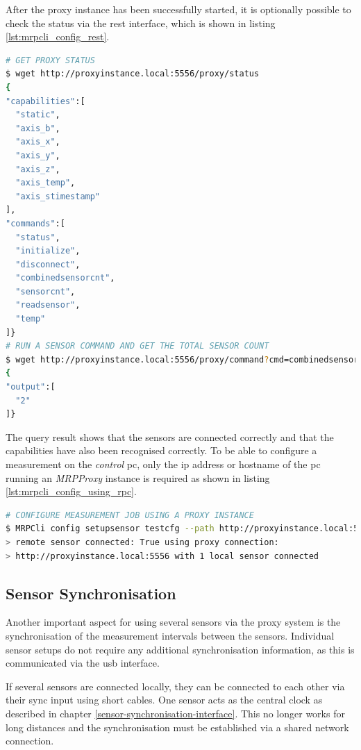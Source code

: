 After the proxy instance has been successfully started, it is optionally
possible to check the status via the \gls{rest} interface, which is
shown in listing \ref{lst:mrpcli_config_rest}.

\begin{lstlisting}[language=bash, caption={MRPProxy provided REST endpoint query example using wget command line tool to send requests}, label=lst:mrpcli_config_rest]
# GET PROXY STATUS
$ wget http://proxyinstance.local:5556/proxy/status
{
"capabilities":[
  "static",
  "axis_b",
  "axis_x",
  "axis_y",
  "axis_z",
  "axis_temp",
  "axis_stimestamp"
],
"commands":[
  "status",
  "initialize",
  "disconnect",
  "combinedsensorcnt",
  "sensorcnt",
  "readsensor",
  "temp"
]}
# RUN A SENSOR COMMAND AND GET THE TOTAL SENSOR COUNT
$ wget http://proxyinstance.local:5556/proxy/command?cmd=combinedsensorcnt
{
"output":[
  "2"
]}
\end{lstlisting}

The query result shows that the sensors are connected correctly and that
the capabilities have also been recognised correctly. To be able to
configure a measurement on the \emph{control} \gls{pc}, only the
\gls{ip} address or hostname of the \gls{pc} running an \emph{MRPProxy}
instance is required as shown in listing
\ref{lst:mrpcli_config_using_rpc}.

\begin{lstlisting}[language=bash, caption={MRPcli usage example to connect with a MRPProxy based network sensor}, label=lst:mrpcli_config_using_rpc]
# CONFIGURE MEASUREMENT JOB USING A PROXY INSTANCE
$ MRPCli config setupsensor testcfg --path http://proxyinstance.local:5556
> remote sensor connected: True using proxy connection:
> http://proxyinstance.local:5556 with 1 local sensor connected
\end{lstlisting}

\hypertarget{sensor-synchronisation}{%
\subsection{Sensor Synchronisation}\label{sensor-synchronisation}}

Another important aspect for using several sensors via the proxy system
is the synchronisation of the measurement intervals between the sensors.
Individual sensor setups do not require any additional synchronisation
information, as this is communicated via the \gls{usb} interface.

If several sensors are connected locally, they can be connected to each
other via their sync input using short cables. One sensor acts as the
central clock as described in chapter
\ref{sensor-synchronisation-interface}. This no longer works for long
distances and the synchronisation must be established via a shared
network connection.

